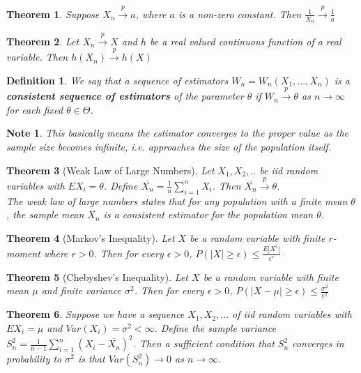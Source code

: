 \documentclass[14pt,twoside]{extreport}
\theoremstyle{dotless}
\newtheorem*{defn}{\footnotesize Definition}
\newtheorem*{thm}{\footnotesize Theorem} %
\newtheorem*{note}{\footnotesize Note} %
\begin{document}
\begin{thm}
    Suppose $X_n \overset{p}{\to} a$, where $a$ is a non-zero constant. Then $\frac{1}{X_n} \overset{p}{\to} \frac{1}{a}$
\end{thm}

\begin{thm}
    Let $X_n \overset{p}{\to} X$ and $h$ be a real valued continuous function of a real variable. Then $h(X_n) \overset{p}{\to} h(X)$
\end{thm}

\begin{defn}
    We say that a sequence of estimators $W_n = W_n(X_1, ..., X_n)$ is a \textbf{consistent sequence of estimators} of the parameter $\theta$ if $W_n \overset{p}{\to} \theta$ as $n \to \infty$ for each fixed $\theta \in \Theta$.
\end{defn}

\begin{note}
    This basically means the estimator converges to the proper value as the sample size becomes infinite, i.e. approaches the size of the population itself.
\end{note}

\begin{thm}[Weak Law of Large Numbers]
    Let $X_1, X_2, ..$ be iid random variables with $EX_i = \theta$. Define $\overline{X_n} = \frac{1}{n} \sum_{i=1}^n X_i$. Then $\overline{X_n} \overset{p}{\to} \theta$. \\
    The weak law of large numbers states that for any population with a finite mean $\theta$, the sample mean $\overline{X_n}$ is a consistent estimator for the population mean $\theta$.
\end{thm}

\begin{thm}[Markov's Inequality]
    Let $X$ be a random variable with finite $r$-moment where $r > 0$. Then for every $\epsilon > 0$, $P(|X| \geq \epsilon) \leq \frac{E|X^r|}{\epsilon^r}$
\end{thm}

\begin{thm}[Chebyshev's Inequality]
    Let $X$ be a random variable with finite mean $\mu$ and finite variance $\sigma^2$. Then for every $\epsilon > 0$, $P(|X-\mu| \geq \epsilon) \leq \frac{\sigma^2}{\epsilon^2}$
\end{thm}

\begin{thm}
    Suppose we have a sequence $X_1, X_2, ...$ of iid random variables with $EX_i = \mu$ and $Var(X_i) = \sigma^2 < \infty$. Define the sample variance $S_n^2 = \frac{1}{n-1} \sum_{i=1}^n (X_i - \overline{X_n})^2$. Then a sufficient condition that $S_n^2$ converges in probability to $\sigma^2$ is that $Var(S_n^2) \to 0$ as $n \to \infty$.
\end{thm}
\end{document}
